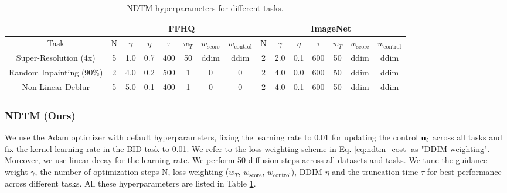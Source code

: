 \begin{table}[t]
\caption{NDTM hyperparameters for different tasks.}
\centering
\small
\begin{tabular}{@{}c|ccccccc|ccccccc@{}}
\toprule
                         & \multicolumn{7}{c|}{FFHQ}                                                        & \multicolumn{7}{c}{ImageNet}                                                     \\ \midrule
Task                     & N & $\gamma$ & $\eta$ & $\tau$ & $w_T$ & $w_\text{score}$ & $w_\text{control}$ & N & $\gamma$ & $\eta$ & $\tau$ & $w_T$ & $w_\text{score}$ & $w_\text{control}$ \\ \midrule
Super-Resolution (4x)    & 5 & 1.0        & 0.7    & 400    & 50    & ddim             & ddim               & 2 & 2.0        & 0.1    & 600    & 50    & ddim             & ddim               \\
Random Inpainting (90\%) & 2 & 4.0        & 0.2    & 500    & 1     & 0                & 0                  & 2 & 4.0        & 0.0    & 600    & 50    & ddim             & ddim               \\
Non-Linear Deblur        & 5 & 5.0        & 0.1    & 400    & 1     & 0                & 0                  & 2 & 4.0        & 0.1    & 600    & 50    & ddim             & ddim               \\ \bottomrule
\end{tabular}
\label{table:ndtm_hparams}
\end{table}

\subsubsection{NDTM (Ours)}
\label{app:ndtm_config}
We use the Adam optimizer \citep{kingma2017adammethodstochasticoptimization} with default hyperparameters, fixing the learning rate to 0.01 for updating the control ${\mathbf{u}}_t$ across all tasks and fix the kernel learning rate in the BID task to 0.01. We refer to the loss weighting scheme in Eq. \ref{eq:ndtm_cost} as "DDIM weighting".  Moreover, we use linear decay for the learning rate. We perform 50 diffusion steps across all datasets and tasks. We tune the guidance weight $\gamma$, the number of optimization steps N, loss weighting ($w_T$, $w_\text{score}$, $w_\text{control}$), DDIM $\eta$ and the truncation time $\tau$ \citep{chung2022comecloserdiffusefaster} for best performance across different tasks. All these hyperparameters are listed in Table \ref{table:ndtm_hparams}.

